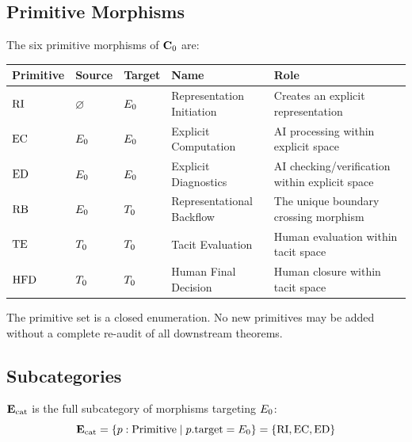 \subsection{Primitive Morphisms}

\begin{definition}[Primitives]
The six primitive morphisms of $\mathbf{C}_0$ are:
\end{definition}

\begin{center}
\begin{tabular}{llll>{\raggedright\arraybackslash}p{4.5cm}}
\toprule
Primitive & Source & Target & Name & Role \\
\midrule
$\mathrm{RI}$ & $\varnothing$ & $E_0$ & Representation Initiation & Creates an explicit representation \\
$\mathrm{EC}$ & $E_0$ & $E_0$ & Explicit Computation & AI processing within explicit space \\
$\mathrm{ED}$ & $E_0$ & $E_0$ & Explicit Diagnostics & AI checking/verification within explicit space \\
$\mathrm{RB}$ & $E_0$ & $T_0$ & Representational Backflow & The unique boundary crossing morphism \\
$\mathrm{TE}$ & $T_0$ & $T_0$ & Tacit Evaluation & Human evaluation within tacit space \\
$\mathrm{HFD}$ & $T_0$ & $T_0$ & Human Final Decision & Human closure within tacit space \\
\bottomrule
\end{tabular}
\end{center}


The primitive set is a closed enumeration. No new primitives may be added without
a complete re-audit of all downstream theorems.

\subsection{Subcategories}

\begin{definition}
$\mathbf{E}_{\mathrm{cat}}$ is the full subcategory of morphisms targeting $E_0$:
\[
  \mathbf{E}_{\mathrm{cat}} = \{p : \mathrm{Primitive} \mid p.\mathrm{target} = E_0\}
        = \{\mathrm{RI}, \mathrm{EC}, \mathrm{ED}\}
\]
\end{definition}


